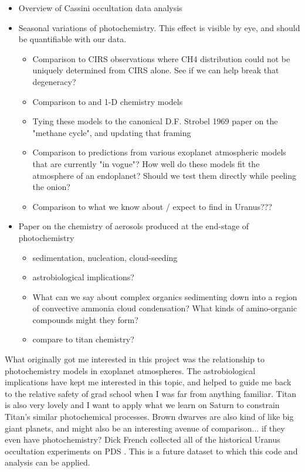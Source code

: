 \documentclass[12pt]{article}
\begin{document}
\begin{itemize}
  \item Overview of Cassini occultation data analysis
  \item Seasonal variations of photochemistry. This effect is visible by eye, and should be quantifiable with our data.
  \begin{itemize}
     \item Comparison to \citep{Fletcher10} CIRS observations where CH4 distribution could not be uniquely determined from CIRS alone. See if we can help break that degeneracy?
     \item Comparison to \citep{Moses05} and \citep{Fouchet09} 1-D chemistry models
     \item Tying these models to the canonical D.F. Strobel 1969 paper on the
      "methane cycle", and updating that framing
     \item Comparison to predictions from various exoplanet atmospheric models that
      are currently "in vogue"? How well do these models fit the atmosphere of
      an endoplanet? Should we test them directly while peeling the onion?
     \item Comparison to what we know about / expect to find in Uranus???
  \end{itemize}
  \item Paper on the chemistry of aerosols produced at the end-stage of photochemistry
  \begin{itemize}
     \item sedimentation, nucleation, cloud-seeding \citep{Fletcher18}
     \item astrobiological implications?
     \item What can we say about complex organics sedimenting down into a region of
      convective ammonia cloud condensation? What kinds of amino-organic
      compounds might they form?
     \item compare to titan chemistry?
  \end{itemize}
\end{itemize}

What originally got me interested in this project was the relationship to
photochemistry models in exoplanet atmospheres. The astrobiological
implications have kept me interested in this topic, and helped to guide me back
to the relative safety of grad school when I was far from anything familiar.
Titan is also very lovely and I want to apply what we learn on Saturn to
constrain Titan's similar photochemical processes. Brown dwarves are also kind
of like big giant planets, and might also be an interesting avenue of
comparison... if they even have photochemistry?  Dick French collected all of
the historical Uranus occultation experiments on PDS \citep{French23}. This is
a future dataset to which this code and analysis can be applied.
\end{document}
